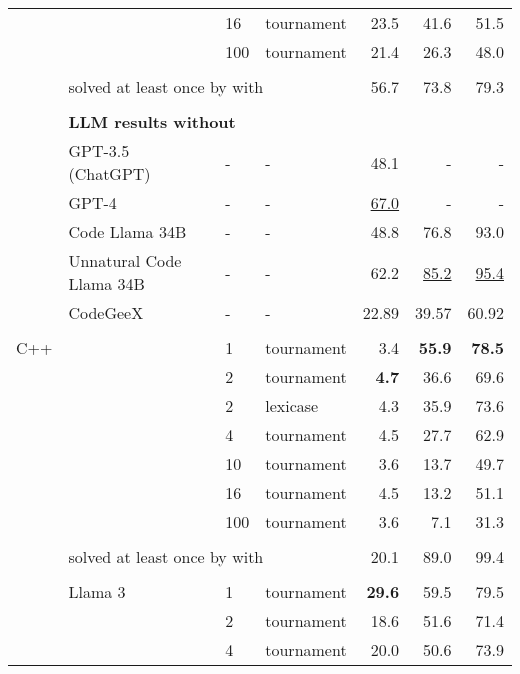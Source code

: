 \begin{table}[t]
\begin{adjustbox}{max width=\textwidth}
\begin{DIFnomarkup}
\begin{tabular}{llllrrr}
       &        & 16  &         tournament &    23.5 &     41.6 &      51.5 \\
       &        & 100 &         tournament &    21.4 &     26.3 &      48.0  \\[1pt]
\cline{3-7}\\[-8pt]
       & \multicolumn{3}{l}{solved at least once by \method{} with \llama{}} & 56.7 &     73.8 &      79.3 \\[1pt]
\cline{2-7}\\[-8pt]
& \multicolumn{6}{l}{\textbf{LLM results without \method{}}} \\
 & GPT-3.5 (ChatGPT) & - &  - &  48.1  &  -   &    - \\
 & GPT-4 & - &  - & \underline{67.0}   &  -   &    - \\
 & Code Llama 34B & - &  - &  48.8  &  76.8   &    93.0 \\
 & Unnatural Code Llama 34B & - &  - &  62.2  &  \underline{85.2}   &    \underline{95.4} \\
 & CodeGeeX & - &  - &  22.89  &  39.57   &    60.92 \\[-2pt]
\midrule\\[-12pt]
C++    & \gpt{} & 1   &         tournament &     3.4 &    \textbf{ 55.9} &      \textbf{78.5} \\
       &        & 2   &         tournament &     \textbf{4.7} &     36.6 &      69.6 \\
       &        & 2   &           lexicase &     4.3 &     35.9 &      73.6 \\
       &        & 4   &         tournament &     4.5 &     27.7 &      62.9 \\
       &        & 10  &         tournament &     3.6 &     13.7 &      49.7 \\
       &        & 16  &         tournament &     4.5 &     13.2 &      51.1 \\
       &        & 100 &         tournament &     3.6 &      7.1 &      31.3 \\[1pt]
\cline{3-7}\\[-8pt]
       & \multicolumn{3}{l}{solved at least once by \method{} with \gpt{}} & 20.1 &     89.0 &      99.4 \\[1pt]
\cline{2-7}\\[-8pt]
    &   Llama 3 & 1   &         tournament &    \textbf{29.6} &     59.5 &      79.5 \\
       &        & 2   &         tournament &    18.6 &     51.6 &      71.4 \\
       &        & 4   &         tournament &    20.0 &     50.6 &      73.9 \\

\end{tabular}
\end{DIFnomarkup}
\end{adjustbox}
\end{table}
